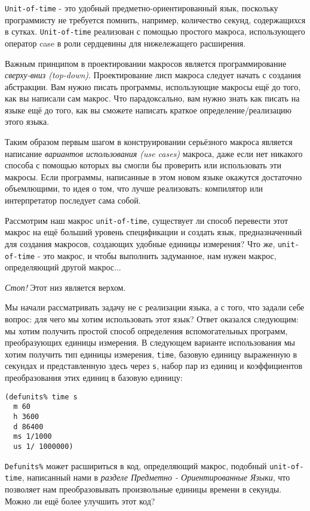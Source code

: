 \verb"Unit-of-time" - это удобный предметно-ориентированный язык, поскольку программисту не требуется помнить, например, количество секунд, содержащихся в сутках. \verb"Unit-of-time" реализован с помощью простого макроса, использующего оператор case в роли сердцевины для нижележащего расширения.

Важным принципом в проектировании макросов является программирование \emph{сверху-вниз (top-down)}. Проектирование лисп макроса следует начать с создания абстракции. Вам нужно писать программы, использующие макросы ещё до того, как вы написали сам макрос. Что парадоксально, вам нужно знать как писать на языке ещё до того, как вы сможете написать краткое определение/реализацию этого языка.

Таким образом первым шагом в конструировании серьёзного макроса является написание \emph{вариантов использования (use cases)} макроса, даже если нет никакого способа с помощью которых вы смогли бы проверить или использовать эти макросы. Если программы, написанные в этом новом языке окажутся достаточно объемлющими, то идея о том, что лучше реализовать: компилятор или интерпретатор последует сама собой.

Рассмотрим наш макрос \verb"unit-of-time", существует ли способ перевести этот макрос на ещё больший уровень спецификации и создать язык, предназначенный для создания макросов, создающих удобные единицы измерения? Что же, \verb"unit-of-time" - это макрос, и чтобы выполнить задуманное, нам нужен макрос, определяющий другой макрос...

\emph{Стоп!} Этот низ является верхом.

Мы начали рассматривать задачу не с реализации языка, а с того, что задали себе вопрос: для чего мы хотим использовать этот язык? Ответ оказался следующим: мы хотим получить простой способ определения вспомогательных программ, преобразующих единицы измерения. В следующем варианте использования мы хотим получить тип единицы измерения, \verb"time", базовую единицу выраженную в секундах и представленную здесь через \verb"s", набор пар из единиц и коэффициентов преобразования этих единиц в базовую единицу:

\begin{verbatim}
(defunits% time s
  m 60
  h 3600
  d 86400
  ms 1/1000
  us 1/ 1000000)
\end{verbatim}

\verb"Defunits%" может расшириться в код, определяющий макрос, подобный \verb"unit-of-time", написанный нами в \emph{разделе Предметно - Ориентированные Языки}, что позволяет нам преобразовывать произвольные единицы времени в секунды. Можно ли ещё более улучшить этот код?

